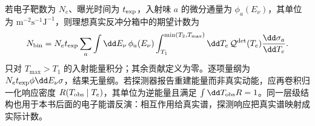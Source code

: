 \begin{derivation}[从微分截面到探测计数]
若电子靶数为 $N_e$、曝光时间为 $t_{\rm exp}$，入射味 $a$ 的微分通量为 $\phi_a(E_\nu)$，其单位为 $\mathrm{m^{-2}s^{-1}J^{-1}}$，则理想真实反冲分箱中的期望计数为
\begin{equation}
 N_{\rm bin}=N_et_{\rm exp}\sum_a\int\dd E_\nu\,\phi_a(E_\nu)
 \int_{T_1}^{\min(T_2,T_{\max})}\dd T_e\,
 \mathcal Q^{\rm det}(T_e)\frac{\dd\sigma_a}{\dd T_e}.
 \label{eq:sm-nue-event-folding}
\end{equation}
只对 $T_{\max}>T_1$ 的入射能量积分；其余贡献定义为零。逐项量纲为 $N_et_{\rm exp}\phi\dd E_\nu\sigma$，结果无量纲。若探测器报告重建能量而非真实动能，应再卷积归一化响应密度 $R(T_{\rm obs}\mid T_e)$，其单位为逆能量且满足 $\int\dd T_{\rm obs}R=1$。同一层级结构也用于本书后面的电子能谱反演：相互作用给真实谱，探测响应把真实谱映射成实际计数。
\end{derivation}

